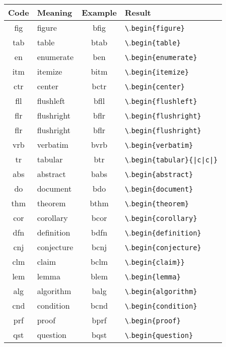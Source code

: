 \documentclass[11pt]{article}
\begin{document}
\begin{table}[htb] 
  \begin{center}
    \begin{tabular}{>{\ttfamily}cl>{\ttfamily}c>{\ttfamily}l}
    \toprule
      \textnormal{Code} & Meaning & \textnormal{Example} & \textnormal{Result} \\
    \midrule
    fig & figure    & bfig{} & \verb.\.\verb.begin{figure}. \\
    tab & table     & btab{} & \verb.\.\verb.begin{table}. \\
    en  & enumerate & ben{}  & \verb.\.\verb.begin{enumerate}. \\
    itm & itemize   & bitm{} & \verb.\.\verb.begin{itemize}. \\
    ctr & center    & bctr{} & \verb.\.\verb.begin{center}. \\
    fll & flushleft & bfll{} & \verb.\.\verb.begin{flushleft}. \\
    flr & flushright& bflr{} & \verb.\.\verb.begin{flushright}. \\
    flr & flushright& bflr{} & \verb.\.\verb.begin{flushright}. \\
    vrb & verbatim  & bvrb{} & \verb.\.\verb.begin{verbatim}. \\
    tr  & tabular   & btr{}  & \verb.\.\verb.begin{tabular}{|c|c|}. \\
    abs & abstract  & babs{} & \verb.\.\verb.begin{abstract}. \\
    do  & document  & bdo{}  & \verb.\.\verb.begin{document}. \\
    thm & theorem   & bthm{} & \verb.\.\verb.begin{theorem}. \\
    cor & corollary & bcor{} & \verb.\.\verb.begin{corollary}. \\
    dfn & definition& bdfn{} & \verb.\.\verb.begin{definition}. \\
    cnj & conjecture& bcnj{} & \verb.\.\verb.begin{conjecture}. \\
    clm & claim     & bclm{} & \verb.\.\verb.begin{claim}}. \\
    lem & lemma     & blem{} & \verb.\.\verb.begin{lemma}. \\
    alg & algorithm & balg{} & \verb.\.\verb.begin{algorithm}. \\
    cnd & condition & bcnd{} & \verb.\.\verb.begin{condition}. \\
    prf & proof     & bprf{} & \verb.\.\verb.begin{proof}. \\
    qst & question  & bqst{} & \verb.\.\verb.begin{question}. \\

\end{tabular}
\end{center}
\end{table}
\end{document}
